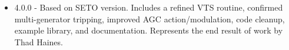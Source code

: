 \begin{itemize}
 em
\item 4.0.0 - Based on SETO version. 
Includes a refined VTS routine, confirmed multi-generator tripping, improved AGC action/modulation, code cleanup, example library, and documentation.
Represents the end result of work by Thad Haines.
\end{itemize}
